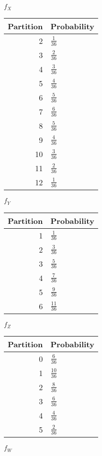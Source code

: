 \documentclass[11pt]{article}
\begin{document}
$f_X$ 
	\begin{tabular}{|r | l|}
	\hline
	Partition & Probability \\ \hline
	2 & $\frac{1}{36}$ \\ \hline
	3 & $\frac{2}{36}$ \\ \hline
	4 & $\frac{3}{36}$ \\ \hline
	5 & $\frac{4}{36}$ \\ \hline
	6 & $\frac{5}{36}$ \\ \hline
	7 & $\frac{6}{36}$ \\ \hline
	8 & $\frac{5}{36}$ \\ \hline
	9 & $\frac{4}{36}$ \\ \hline
	10 & $\frac{3}{36}$ \\ \hline
	11 & $\frac{2}{36}$ \\ \hline
	12 & $\frac{1}{36}$ \\ \hline
	\end{tabular}

$f_Y$
	\begin{tabular}{|r | l|}
	\hline
	Partition & Probability \\ \hline
	1 & $\frac{1}{36}$ \\ \hline
	2 & $\frac{3}{36}$ \\ \hline
	3 & $\frac{5}{36}$ \\ \hline
	4 & $\frac{7}{36}$ \\ \hline
	5 & $\frac{9}{36}$ \\ \hline
	6 & $\frac{11}{36}$ \\ \hline
	\end{tabular}

$f_Z$
	\begin{tabular}{|r | l|}
	\hline
	Partition & Probability \\ \hline
	0 & $\frac{6}{36}$ \\ \hline
	1 & $\frac{10}{36}$ \\ \hline
	2 & $\frac{8}{36}$ \\ \hline
	3 & $\frac{6}{36}$ \\ \hline
	4 & $\frac{4}{36}$ \\ \hline
	5 & $\frac{2}{36}$ \\ \hline
	\end{tabular}

$f_W$
\end{document}
